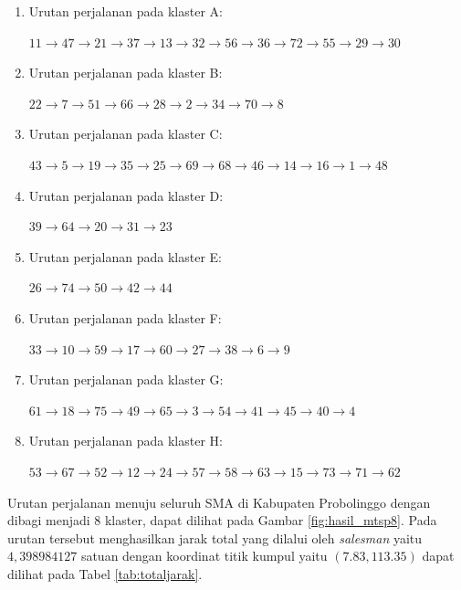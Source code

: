 \begin{enumerate}
\item Urutan perjalanan pada klaster A:

$11\rightarrow47\rightarrow21\rightarrow37\rightarrow13\rightarrow32\rightarrow56\rightarrow36\rightarrow72\rightarrow55\rightarrow29\rightarrow30$

\item Urutan perjalanan pada klaster B:

$22\rightarrow7\rightarrow51\rightarrow66\rightarrow28\rightarrow2\rightarrow34\rightarrow70\rightarrow8$

\item Urutan perjalanan pada klaster C:

$43\rightarrow5\rightarrow19\rightarrow35\rightarrow25\rightarrow69\rightarrow68\rightarrow46\rightarrow14\rightarrow16\rightarrow1\rightarrow48$

\item Urutan perjalanan pada klaster D:

$39\rightarrow64\rightarrow20\rightarrow31\rightarrow23$

\item Urutan perjalanan pada klaster E:

$26\rightarrow74\rightarrow50\rightarrow42\rightarrow44$

\item Urutan perjalanan pada klaster F:

$33\rightarrow10\rightarrow59\rightarrow17\rightarrow60\rightarrow27\rightarrow38\rightarrow6\rightarrow9$

\item Urutan perjalanan pada klaster G:

$61\rightarrow18\rightarrow75\rightarrow49\rightarrow65\rightarrow3\rightarrow54\rightarrow41\rightarrow45\rightarrow40\rightarrow4$

\item Urutan perjalanan pada klaster H:

$53\rightarrow67\rightarrow52\rightarrow12\rightarrow24\rightarrow57\rightarrow58\rightarrow63\rightarrow15\rightarrow73\rightarrow71\rightarrow62$
\end{enumerate}

Urutan perjalanan menuju seluruh SMA di Kabupaten Probolinggo dengan dibagi menjadi 8 klaster, dapat dilihat pada Gambar \ref{fig:hasil_mtsp8}. Pada urutan tersebut menghasilkan jarak total yang dilalui oleh \textit{salesman} yaitu $4,398984127$ satuan dengan koordinat titik kumpul yaitu $(7.83, 113.35)$ dapat dilihat pada Tabel \ref{tab:totaljarak}.

